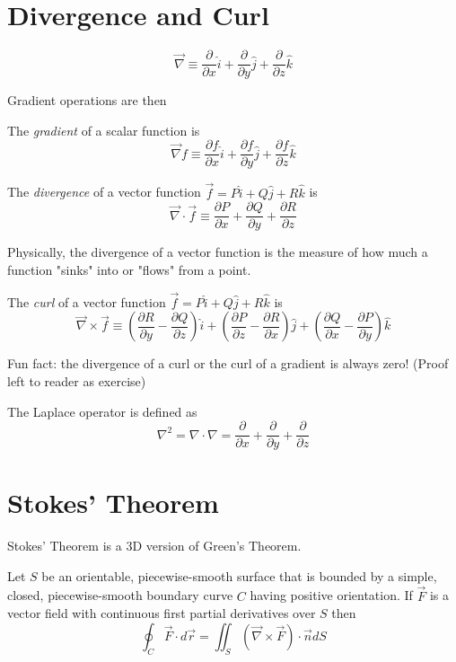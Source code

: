 \documentclass[12pt]{article}
\begin{document}
\section{Divergence and Curl}

\begin{defn}
	$$\vec{\nabla} \equiv \frac{\partial}{\partial x}\hat{i} + \frac{\partial}{\partial y}\hat{j} + \frac{\partial}{\partial z}\hat{k}$$
\end{defn}

Gradient operations are then

\begin{defn}
The \emph{gradient} of a scalar function is
	$$\vec{\nabla}f \equiv \frac{\partial f}{\partial x}\hat{i} + \frac{\partial f}{\partial y}\hat{j} + \frac{\partial f}{\partial z}\hat{k}$$
\end{defn}

\begin{defn}
	The \emph{divergence} of a vector function $\vec{f} = P\hat{i} + Q\hat{j} + R\hat{k}$ is
	$$\vec{\nabla}\cdot \vec{f} \equiv \frac{\partial P}{\partial x} + \frac{\partial Q}{\partial y} + \frac{\partial R}{\partial z}$$
\end{defn}

Physically, the divergence of a vector function is the measure of how much a function "sinks" into or "flows" from a point.

\begin{defn}
	The \emph{curl} of a vector function $\vec{f} = P\hat{i} + Q\hat{j} + R\hat{k}$ is
	$$\vec{\nabla}\times \vec{f} \equiv \left(\frac{\partial R}{\partial y} - \frac{\partial Q}{\partial z}\right)\hat{i} + \left(\frac{\partial P}{\partial z} - \frac{\partial R}{\partial x}\right)\hat{j} + \left(\frac{\partial Q}{\partial x} - \frac{\partial P}{\partial y}\right)\hat{k}$$
\end{defn}

Fun fact: the divergence of a curl or the curl of a gradient is always zero! (Proof left to reader as exercise)

\begin{defn}
	The Laplace operator is defined as
	$$\nabla^2 = \nabla\cdot\nabla = \frac{\partial}{\partial x} + \frac{\partial}{\partial y} + \frac{\partial}{\partial z}$$
\end{defn}

\section{Stokes' Theorem}
Stokes' Theorem is a 3D version of Green's Theorem.
\begin{thm}
	Let $S$ be an orientable, piecewise-smooth surface that is bounded by a simple, closed, piecewise-smooth boundary curve $C$ having positive orientation. If $\vec{F}$ is a vector field with continuous first partial derivatives over $S$ then
	$$\oint_C \vec{F}\cdot d\vec{r} = \iint_S\left(\vec{\nabla}\times\vec{F}\right)\cdot\vec{n}dS$$
\end{thm}
\end{document}

